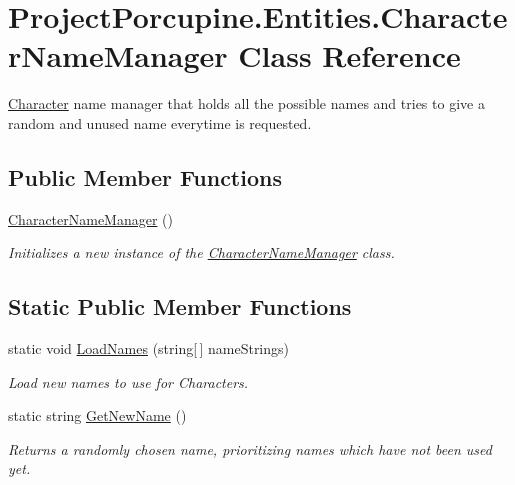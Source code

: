 \hypertarget{class_project_porcupine_1_1_entities_1_1_character_name_manager}{}\section{Project\+Porcupine.\+Entities.\+Character\+Name\+Manager Class Reference}
\label{class_project_porcupine_1_1_entities_1_1_character_name_manager}


\hyperlink{class_project_porcupine_1_1_entities_1_1_character}{Character} name manager that holds all the possible names and tries to give a random and unused name everytime is requested.  


\subsection*{Public Member Functions}
\begin{DoxyCompactItemize}
\item 
\hyperlink{class_project_porcupine_1_1_entities_1_1_character_name_manager_a92c82c6cf338443c6c2bd7a40aefc484}{Character\+Name\+Manager} ()
\begin{DoxyCompactList}\small\item\em Initializes a new instance of the \hyperlink{class_project_porcupine_1_1_entities_1_1_character_name_manager}{Character\+Name\+Manager} class. \end{DoxyCompactList}\end{DoxyCompactItemize}
\subsection*{Static Public Member Functions}
\begin{DoxyCompactItemize}
\item 
static void \hyperlink{class_project_porcupine_1_1_entities_1_1_character_name_manager_aaa230ecfbd820bd719090425d5c67a97}{Load\+Names} (string\mbox{[}$\,$\mbox{]} name\+Strings)
\begin{DoxyCompactList}\small\item\em Load new names to use for Characters. \end{DoxyCompactList}\item 
static string \hyperlink{class_project_porcupine_1_1_entities_1_1_character_name_manager_a68badf7451947de52b682c44cc8b2dfd}{Get\+New\+Name} ()
\begin{DoxyCompactList}\small\item\em Returns a randomly chosen name, prioritizing names which have not been used yet. \end{DoxyCompactList}\end{DoxyCompactItemize}


